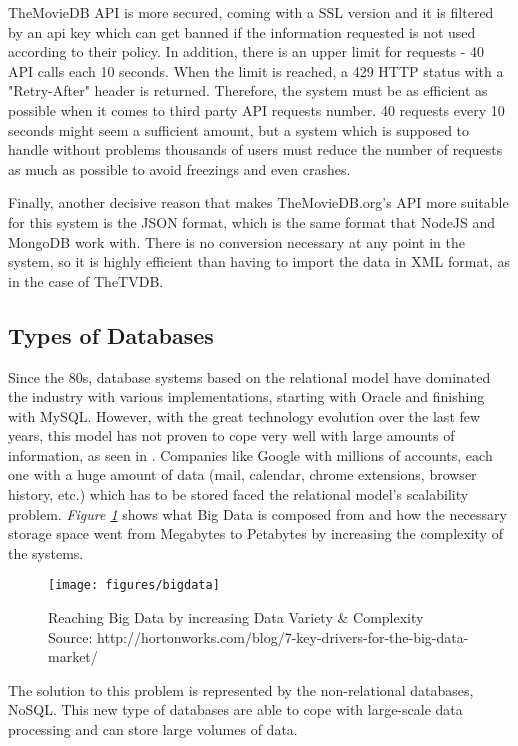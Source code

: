 TheMovieDB API is more secured, coming with a SSL version and it is filtered by an api key which can get banned if the information requested is not used according to their policy. In addition, there is an upper limit for requests - 40 API calls each 10 seconds. When the limit is reached, a 429 HTTP status with a "Retry-After" header is returned. Therefore, the system must be as efficient as possible when it comes to third party API requests number. 40 requests every 10 seconds might seem a sufficient amount, but a system which is supposed to handle without problems thousands of users must reduce the number of requests as much as possible to avoid freezings and even crashes.

Finally, another decisive reason that makes TheMovieDB.org's API more suitable for this system is the JSON format, which is the same format that NodeJS and MongoDB work with. There is no conversion necessary at any point in the system, so it is highly efficient than having to import the data in XML format, as in the case of TheTVDB.

\subsection{Types of Databases}

Since the 80s, database systems based on the relational model have dominated the industry with various implementations, starting with Oracle and finishing with MySQL. However, with the great technology evolution over the last few years, this model has not proven to cope very well with large amounts of information, as seen in \cite{10}. Companies like Google with millions of accounts, each one with a huge amount of data (mail, calendar, chrome extensions, browser history, etc.) which has to be stored faced the relational model's scalability problem. \textit{Figure \ref{fig:bigdata}} shows what Big Data is composed from and how the necessary storage space went from Megabytes to Petabytes by increasing the complexity of the systems.

\begin{figure}[h]
\centering
\texttt{[image: figures/bigdata]}
\caption{Reaching Big Data by increasing Data Variety \& Complexity \newline Source: http://hortonworks.com/blog/7-key-drivers-for-the-big-data-market/}
\label{fig:bigdata}
\end{figure}

The solution to this problem is represented by the non-relational databases, NoSQL. This new type of databases are able to cope with large-scale data processing and can store large volumes of data.

